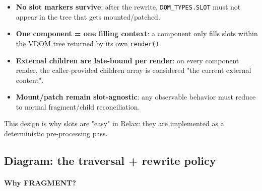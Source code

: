 \begin{itemize}
  \item \textbf{No slot markers survive}: after the rewrite, \texttt{DOM\_TYPES.SLOT} must not appear in the tree that gets mounted/patched.
  \item \textbf{One component = one filling context}: a component only fills slots within the VDOM tree returned by its own \texttt{render()}.
  \item \textbf{External children are late-bound per render}: on every component render, the caller-provided children array is considered "the current external content".
  \item \textbf{Mount/patch remain slot-agnostic}: any observable behavior must reduce to normal fragment/child reconciliation.
\end{itemize}

This design is why slots are "easy" in Relax: they are implemented as a deterministic pre-processing pass.

\subsection*{Diagram: the traversal + rewrite policy}

\begin{center}
\end{center}

\paragraph{Why FRAGMENT?}

